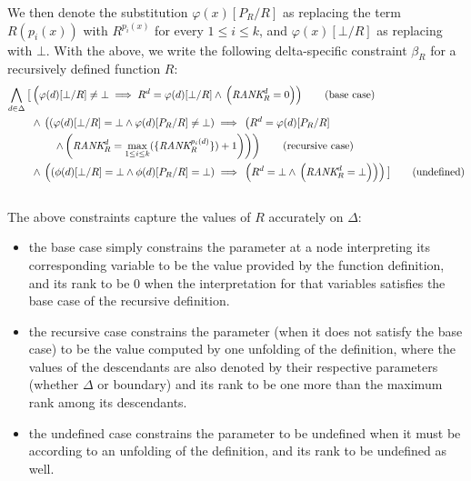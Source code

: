 We then denote the substitution $\varphi(x)[P_{R}/R]$ as replacing the term $R(p_i(x))$ with $R^{p_i(x)}$ for every $1\leq{} i \leq{}k$, and $\varphi(x)[\bot{}/R]$ as replacing with $\bot{}$.
With the above, we write the following delta-specific constraint $\beta_{R}$ for a recursively defined function $R$:\\

\begin{align*}
\bigwedge\limits_{d \in{} \Delta} \big\lbrack{} & \left( \varphi{}(d)[\bot{}/R] \neq{} \bot{} \implies{} R^{d} = \varphi{}(d)[\bot{}/R] \land{} \left(\textit{RANK}_{R}^{d} = 0\right) \right)\tag{base case}\\
&\land{}  \left( \left( \varphi{}(d)[\bot{}/R] = \bot{} \land{} \varphi{}(d)[P_{R}/R] \neq{} \bot{}  \right) \implies{} \left( R^{d} = \varphi{}(d)[P_{R}/R] \right.\right.\notag{}\\
&\qquad{} \left.\left. \land{} \left(\textit{RANK}_{R}^{d} = \max\limits_{1 \leq{} i \leq{} k}(\{\textit{RANK}_{R}^{p_i(d)} \}) + 1 \right)\right)  \right) \tag{recursive case}\\
& \land{}  \left( \left( \phi{}(d)[\bot{}/R] = \bot{} \land{} \phi{}(d)[P_{R}/R] = \bot{} \right) \implies{} \left( R^{d} = \bot{} \land{} \left(\textit{RANK}_{R}^{d} = \bot{} \right)\right) \right) \big\rbrack{} \tag{undefined}
\end{align*}\\

The above constraints capture the values of $R$ accurately on $\Delta{}$:
\begin{itemize}
\item{} the base case simply constrains the parameter at a node interpreting its corresponding variable to be the value provided by the function definition, and its rank to be $0$ when the interpretation for that variables satisfies the base case of the recursive definition.

\item{} the recursive case constrains the parameter (when it does not satisfy the base case) to be the value computed by one unfolding of the definition, where the values of the descendants are also denoted by their respective parameters (whether $\Delta{}$ or boundary) and its rank to be one more than the maximum rank among its descendants.

\item{} the undefined case constrains the parameter to be undefined when it must be according to an unfolding of the definition, and its rank to be undefined as well.
\end{itemize}

